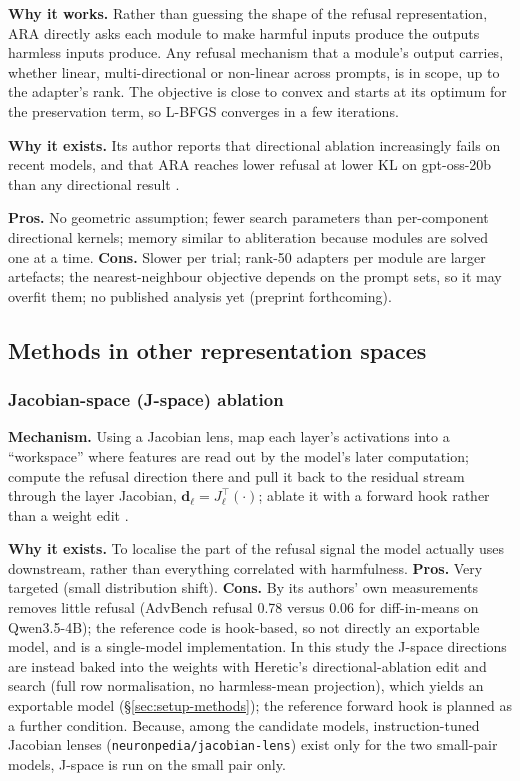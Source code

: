 \textbf{Why it works.} Rather than guessing the shape of the refusal
representation, ARA directly asks each module to make harmful inputs produce
the outputs harmless inputs produce. Any refusal mechanism that a module's
output carries, whether linear, multi-directional or non-linear across
prompts, is in scope, up to the adapter's rank. The objective is close to
convex and starts at its optimum for the preservation term, so L-BFGS
converges in a few iterations.

\textbf{Why it exists.} Its author reports that directional ablation
increasingly fails on recent models, and that ARA reaches lower refusal at
lower KL on gpt-oss-20b than any directional result \cite{weidmann2026ara}.

\textbf{Pros.} No geometric assumption; fewer search parameters than
per-component directional kernels; memory similar to abliteration because
modules are solved one at a time.
\textbf{Cons.} Slower per trial; rank-50 adapters per module are larger
artefacts; the nearest-neighbour objective depends on the prompt sets, so it
may overfit them; no published analysis yet (preprint forthcoming).

\subsection{Methods in other representation spaces}

\subsubsection{Jacobian-space (J-space) ablation}
\label{sec:m-jspace}
\textbf{Mechanism.} Using a Jacobian lens, map each layer's activations into a
``workspace'' where features are read out by the model's later computation;
compute the refusal direction there and pull it back to the residual stream
through the layer Jacobian, $\mathbf{d}_\ell = J_\ell^{\top}(\cdot)$; ablate it
with a forward hook rather than a weight edit
\cite{sekinal2026jspace}.

\textbf{Why it exists.} To localise the part of the refusal signal the model
actually uses downstream, rather than everything correlated with harmfulness.
\textbf{Pros.} Very targeted (small distribution shift).
\textbf{Cons.} By its authors' own measurements removes little refusal
(AdvBench refusal 0.78 versus 0.06 for diff-in-means on Qwen3.5-4B); the
reference code is hook-based, so not directly an exportable model, and is a
single-model implementation. In this study the J-space directions are instead
baked into the weights with Heretic's directional-ablation edit and search
(full row normalisation, no harmless-mean projection), which yields an
exportable model (\S\ref{sec:setup-methods}); the reference forward hook is
planned as a further condition. Because, among the candidate models,
instruction-tuned Jacobian lenses (\texttt{neuronpedia/jacobian-lens}) exist
only for the two small-pair models, J-space is run on the small pair only.

